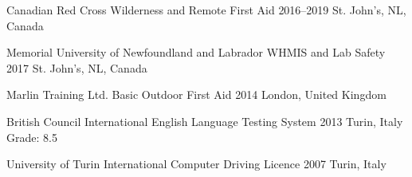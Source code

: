 

\begin{cventries}

  \cventry
    {Canadian Red Cross} %
    {Wilderness and Remote First Aid} %
    {2016--2019} %
    {St. John's, NL, Canada} %
    {
    }

  \cventry
    {Memorial University of Newfoundland and Labrador} %
    {WHMIS and Lab Safety} %
    {2017} %
    {St. John's, NL, Canada} %
    {
    }

  \cventry
    {Marlin Training Ltd.} %
    {Basic Outdoor First Aid} %
    {2014} %
    {London, United Kingdom} %
    {
    }

  \cventry
    {British Council} %
    {International English Language Testing System} %
    {2013} %
    {Turin, Italy} %
    {
      Grade: 8.5
    }

  \cventry
    {University of Turin} %
    {International Computer Driving Licence} %
    {2007} %
    {Turin, Italy} %
    {
    }

\end{cventries}
